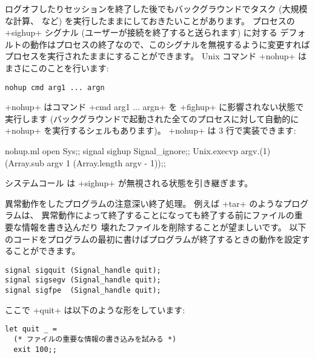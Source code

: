 \begin{example}
ログオフしたりセッションを終了した後でもバックグラウンドでタスク (大規模な計算、  など)
を実行したままにしておきたいことがあります。
プロセスの \ml+sighup+ シグナル (ユーザーが接続を終了すると送られます) に対する
デフォルトの動作はプロセスの終了なので、このシグナルを無視するように変更すれば
プロセスを実行されたままにすることができます。
Unix コマンド \ml+nohup+ はまさにこのことを行います:
\begin{lstlisting}
nohup cmd arg1 ... argn
\end{lstlisting}
\ml+nohup+ はコマンド \ml+cmd arg1 ... argn+ を \ml+fighup+ に影響されない状態で実行します
(バックグラウンドで起動された全てのプロセスに対して自動的に \ml+nohup+ を実行するシェルもあります)。
\ml+nohup+ は 3 行で実装できます:
%
\begin{listingcodefile}{nohup.ml}
open Sys;;
signal sighup Signal_ignore;;
Unix.execvp argv.(1) (Array.sub argv 1 (Array.length argv - 1));;
\end{listingcodefile}
%
システムコール  は \ml+sighup+ が無視される状態を引き継ぎます。
\end{example}

\begin{example}
異常動作をしたプログラムの注意深い終了処理。
例えば \ml+tar+ のようなプログラムは、
異常動作によって終了することになっても終了する前にファイルの重要な情報を書き込んだり
壊れたファイルを削除することが望ましいです。
以下のコードをプログラムの最初に書けばプログラムが終了するときの動作を設定することができます。
%
\begin{lstlisting}
signal sigquit (Signal_handle quit);
signal sigsegv (Signal_handle quit);
signal sigfpe  (Signal_handle quit);
\end{lstlisting}
%
ここで \ml+quit+ は以下のような形をしています:
%
\begin{lstlisting}
let quit _ =
  (* ファイルの重要な情報の書き込みを試みる *)
  exit 100;;
\end{lstlisting}
\end{example}

